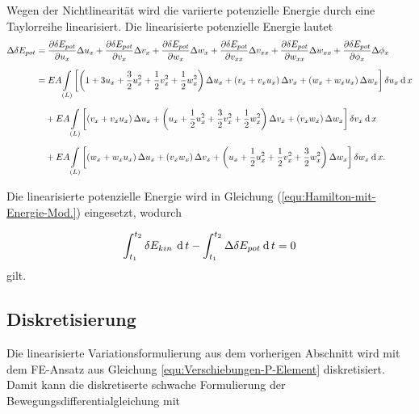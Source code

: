 	Wegen der Nichtlinearität wird die variierte potenzielle Energie durch eine Taylorreihe linearisiert. Die linearisierte potenzielle Energie lautet
	\begin{equation}\label{equ:Epot-mit-Taylor-Variation}
	\begin{aligned}
	\Delta \delta E_{pot} & = \dfrac{\partial \delta E_{pot}}{\partial u_{x}}\Delta u_{x} + \dfrac{\partial \delta E_{pot}}{\partial v_{x}}\Delta v_{x} +\dfrac{\partial \delta E_{pot}}{\partial w_{x}}\Delta w_{x} +\dfrac{\partial \delta E_{pot}}{\partial v_{xx}}\Delta v_{xx} +\dfrac{\partial \delta E_{pot}}{\partial w_{xx}}\Delta w_{xx} + \dfrac{\partial \delta E_{pot}}{\partial \phi_{x}}\Delta \phi_{x} \\[2mm]
	& = EA \underset{(L)}{\int} \left[ \left( 1+3u_{x}+\dfrac{3}{2}u_{x}^{2}+\dfrac{1}{2}v_{x}^{2}+\dfrac{1}{2}w_{x}^{2} \right) \Delta u_{x} + \left( v_{x}+v_{x}u_{x} \right) \Delta v_{x} + \left( w_{x}+w_{x}u_{x} \right) \Delta w_{x} \right] \delta u_{x} \: \mathrm{d}\, x \\[2mm]
	& \quad + EA \underset{(L)}{\int} \left[ \left( v_{x}+v_{x}u_{x} \right) \Delta u_{x} + \left( u_{x}+\dfrac{1}{2}u_{x}^{2}+\dfrac{3}{2}v_{x}^{2}+\dfrac{1}{2}w_{x}^{2} \right) \Delta v_{x} + \left( v_{x}w_{x} \right) \Delta w_{x} \right] \delta v_{x} \: \mathrm{d}\, x \\[2mm]
	& \quad + EA \underset{(L)}{\int} \left[ \left( w_{x}+w_{x}u_{x} \right) \Delta u_{x} + \left( v_{x}w_{x} \right) \Delta v_{x} + \left( u_{x}+\dfrac{1}{2}u_{x}^{2}+\dfrac{1}{2}v_{x}^{2}+\dfrac{3}{2}w_{x}^{2} \right) \Delta w_{x} \right] \delta w_{x} \: \mathrm{d}\, x .
	\end{aligned}
	\end{equation}
	
	Die linearisierte potenzielle Energie wird in Gleichung (\ref{equ:Hamilton-mit-Energie-Mod.}) eingesetzt, wodurch
	
	\begin{equation}\label{equ:Hamilton-mit-lin.Energie-Mod.}
	\int_{t_{1}}^{t_{2}} \delta E_{kin} \, \: \mathrm{d}\, t  - \int_{t_{1}}^{t_{2}} \Delta\delta E_{pot} \: \mathrm{d}\, t = 0
	\end{equation}
	gilt. 
	
	
	\subsection{Diskretisierung}
	Die linearisierte Variationsformulierung aus dem vorherigen Abschnitt wird mit dem FE-Ansatz aus Gleichung \eqref{equ:Verschiebungen-P-Element} diskretisiert. Damit kann die diskretiserte schwache Formulierung der Bewegungsdifferentialgleichung mit
	
